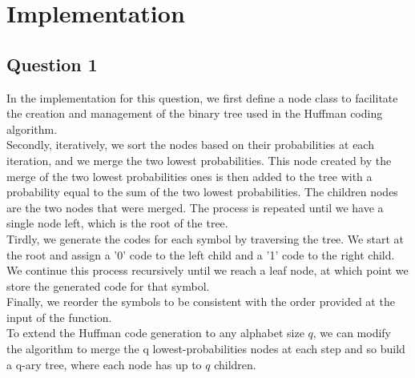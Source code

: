 \documentclass[]{template}
\newcommand{\tablemat}{~}
\renewcommand{\tablemat}{\tableofcontents}
\begin{document}
\begin{guardpage}
    \begin{authors}{0.18}
    \end{authors}

\end{guardpage}

\newpage
\tablemat
\newpage

\section{Implementation}

    \subsection{Question 1}
        In the implementation for this question, we first define a node class to facilitate the creation and management of the binary tree used in the Huffman coding algorithm.\\
        
        \noindent
        Secondly, iteratively, we sort the nodes based on their probabilities at each iteration, and we merge the two lowest probabilities. This node created
        by the merge of the two lowest probabilities ones is then added to the tree with a probability equal to the sum of the two lowest probabilities. 
        The children nodes are the two nodes that were merged. The process is repeated until we have a single node left, which is the root of the tree. \\

        \noindent
        Tirdly, we generate the codes for each symbol by traversing the tree. We start at the root and assign a '0' code to the left child and a '1' code to
        the right child. We continue this process recursively until we reach a leaf node, at which point we store the generated code for that symbol.\\

        \noindent
        Finally, we reorder the symbols to be consistent with the order provided at the input of the function.\\

        \noindent
        To extend the Huffman code generation to any alphabet size $q$, we can modify the algorithm to merge the q lowest-probabilities
        nodes at each step and so build a q-ary tree, where each node has up to $q$ children.\\
        
\end{document}
